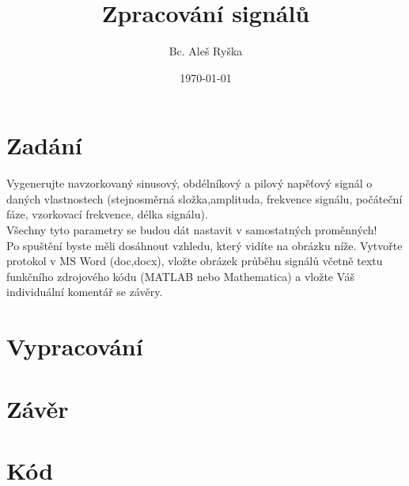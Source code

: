 \documentclass{article}
\title{Zpracování signálů} %
\author{Bc. Aleš Ryška} %
\date{\today} %
\begin{document}
\maketitle %



\section{Zadání}
Vygenerujte navzorkovaný sinusový, obdélníkový a pilový napěťový signál o daných vlastnostech (stejnosměrná složka,amplituda, frekvence signálu, počáteční fáze, vzorkovací frekvence, délka signálu).\\
Všechny tyto parametry se budou dát nastavit v samostatných proměnných!\\
Po spuštění byste měli dosáhnout vzhledu, který vidíte na obrázku níže. Vytvořte protokol v MS Word (doc,docx), vložte obrázek průběhu signálů včetně textu funkčního zdrojového kódu (MATLAB nebo Mathematica) a vložte Váš individuální komentář se závěry.
\section{Vypracování}

\section{Závěr}

\section{Kód}
\end{document}
